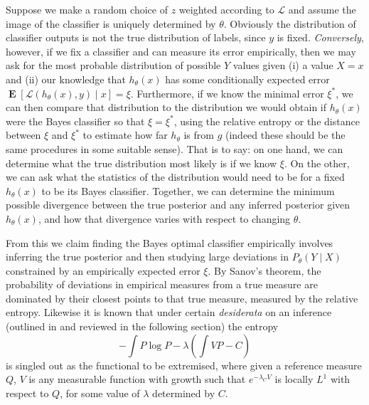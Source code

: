 \documentclass[11pt]{amsart}
\numberwithin{equation}{section}
\theoremstyle{remark}
\theoremstyle{remark}
\DeclareMathOperator{\E}{\mathbf{E}}
\newcommand{\lag}{\mathcal{L}}
\begin{document}
Suppose we make a random choice of $z$ weighted according to $\lag$ and assume the image of the classifier is uniquely determined by $\theta$. Obviously the distribution of classifier outputs is not the true distribution of labels, since $y$ is fixed. {\it Conversely}, however, if we fix a classifier and can measure its error empirically, then we may ask for the most probable distribution of possible $Y$ values given (i) a value $X = x$ and (ii) our knowledge that $h_\theta(x)$ has some conditionally expected error $\E[\lag(h_\theta(x), y) \mid x] = \xi$. Furthermore, if we know the minimal error $\xi^*$, we can then compare that distribution to the distribution we would obtain if $h_\theta(x)$ were the Bayes classifier so that $\xi = \xi^*$, using the relative entropy or the distance between $\xi$ and $\xi^*$ to estimate how far $h_\theta$ is from $g$ (indeed these should be the same procedures in some suitable sense). That is to say: on one hand, we can determine what the true distribution most likely is if we know $\xi$. On the other, we can ask what the statistics of the distribution would need to be for a fixed $h_\theta(x)$ to be its Bayes classifier. Together, we can determine the minimum possible divergence between the true posterior and any inferred posterior given $h_\theta(x)$, and how that divergence varies with respect to changing $\theta$. 


From this we claim finding the Bayes optimal classifier empirically involves inferring the true posterior and then studying large deviations in $P_\theta(Y \mid X)$ constrained by an empirically expected error $\xi$. By Sanov's theorem, the probability of deviations in empirical measures from a true measure are dominated by their closest points to that true measure, measured by the relative entropy. Likewise it is known that under certain {\it desiderata} on an inference (outlined in \cite{shore1980axiomatic} and reviewed in the following section) the entropy
\[
    - \int P \log P - \lambda \left( \int V P - C\right)
\]
is singled out as the functional to be extremised, where given a reference measure $Q$, $V$ is any measurable function with growth such that $e^{-\lambda_C V}$ is locally $L^1$ with respect to $Q$, for some value of $\lambda$ determined by $C$. 
\end{document}
